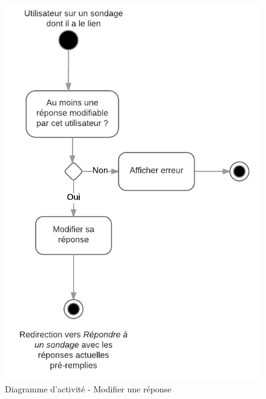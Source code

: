 \documentclass[titlepage]{report}
\begin{document}
\begin{figure}[h]
	\caption{Diagramme d'activité - Modifier une réponse}
	\label{annexe_diagramme_activite_modifierReponse}
	\centering
	\includegraphics[scale=0.7]{figures/diagrammes/activite_modifierReponse.png}
\end{figure}
\end{document}
